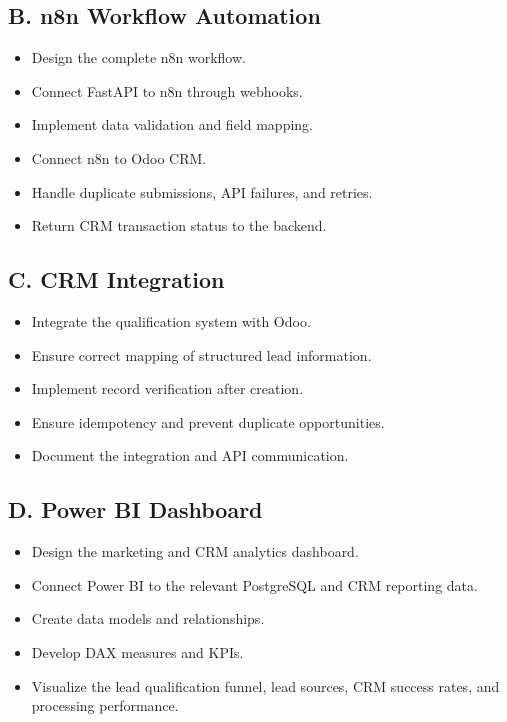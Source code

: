 \documentclass[11pt,a4paper]{article}
\begin{document}
\subsection*{B. n8n Workflow Automation}
\begin{itemize}
  \item Design the complete n8n workflow.
  \item Connect FastAPI to n8n through webhooks.
  \item Implement data validation and field mapping.
  \item Connect n8n to Odoo CRM.
  \item Handle duplicate submissions, API failures, and retries.
  \item Return CRM transaction status to the backend.
\end{itemize}

\subsection*{C. CRM Integration}
\begin{itemize}
  \item Integrate the qualification system with Odoo.
  \item Ensure correct mapping of structured lead information.
  \item Implement record verification after creation.
  \item Ensure idempotency and prevent duplicate opportunities.
  \item Document the integration and API communication.
\end{itemize}

\subsection*{D. Power BI Dashboard}
\begin{itemize}
  \item Design the marketing and CRM analytics dashboard.
  \item Connect Power BI to the relevant PostgreSQL and CRM reporting data.
  \item Create data models and relationships.
  \item Develop DAX measures and KPIs.
  \item Visualize the lead qualification funnel, lead sources, CRM success rates, and processing performance.
\end{itemize}
\end{document}
